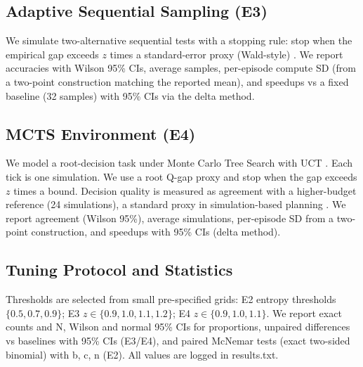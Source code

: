 \subsection{Adaptive Sequential Sampling (E3)}
We simulate two-alternative sequential tests with a stopping rule: stop when the empirical gap exceeds $z$ times a standard-error proxy (Wald-style) \cite{Wald1945Sequential}. We report accuracies with Wilson 95\% CIs, average samples, per-episode compute SD (from a two-point construction matching the reported mean), and speedups vs a fixed baseline (32 samples) with 95\% CIs via the delta method.

\subsection{MCTS Environment (E4)}
We model a root-decision task under Monte Carlo Tree Search with UCT \cite{Kocsis2006UCT}. Each tick is one simulation. We use a root Q-gap proxy and stop when the gap exceeds $z$ times a bound. Decision quality is measured as agreement with a higher-budget reference (24 simulations), a standard proxy in simulation-based planning \cite{Coulom2006MCTS}. We report agreement (Wilson 95\%), average simulations, per-episode SD from a two-point construction, and speedups with 95\% CIs (delta method).

\subsection{Tuning Protocol and Statistics}
Thresholds are selected from small pre-specified grids: E2 entropy thresholds $\{0.5, 0.7, 0.9\}$; E3 $z \in \{0.9,1.0,1.1,1.2\}$; E4 $z \in \{0.9,1.0,1.1\}$. We report exact counts and N, Wilson and normal 95\% CIs for proportions, unpaired differences vs baselines with 95\% CIs (E3/E4), and paired McNemar tests (exact two-sided binomial) with b, c, n (E2). All values are logged in results.txt.

